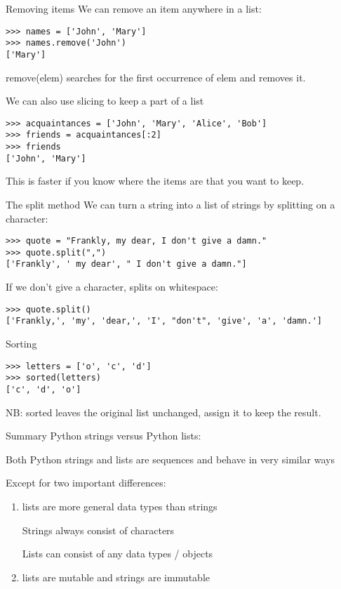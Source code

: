 \documentclass[aspectratio=169,usenames,dvipsnames]{beamer}
\begin{document}
\begin{frame}[fragile]{Removing items}
We can remove an item anywhere in a list:
\begin{lstlisting} 
>>> names = ['John', 'Mary']
>>> names.remove('John')
['Mary']
\end{lstlisting}

    remove(elem) searches for the first occurrence of elem
    and removes it.

\pause
We can also use slicing to keep a part of a list
\begin{lstlisting} 
>>> acquaintances = ['John', 'Mary', 'Alice', 'Bob']
>>> friends = acquaintances[:2]
>>> friends
['John', 'Mary']
\end{lstlisting}

This is faster if you know where the items are that you want to keep.
\end{frame}


\begin{frame}[fragile]{The split method}
We can turn a string into a list of strings
by splitting on a character:
\begin{lstlisting} 
>>> quote = "Frankly, my dear, I don't give a damn."
>>> quote.split(",")
['Frankly', ' my dear', " I don't give a damn."]
\end{lstlisting}

\pause
If we don't give a character, splits on whitespace:
\begin{lstlisting} 
>>> quote.split()
['Frankly,', 'my', 'dear,', 'I', "don't", 'give', 'a', 'damn.']
\end{lstlisting}
\end{frame}


\begin{frame}[fragile]{Sorting}
\begin{lstlisting} 
>>> letters = ['o', 'c', 'd']
>>> sorted(letters)
['c', 'd', 'o']
\end{lstlisting}

NB: sorted leaves the original list unchanged,
assign it to keep the result.
\end{frame}

\begin{frame}[fragile]{Summary}
Python strings versus Python lists:

Both Python strings and lists are sequences and behave in very similar ways

Except for two important differences:
\begin{enumerate}
\item lists are more general data types than strings

    Strings always consist of characters

    Lists can consist of any data types / objects

\item lists are mutable and strings are immutable
\end{enumerate}
\end{frame}
\end{document}
